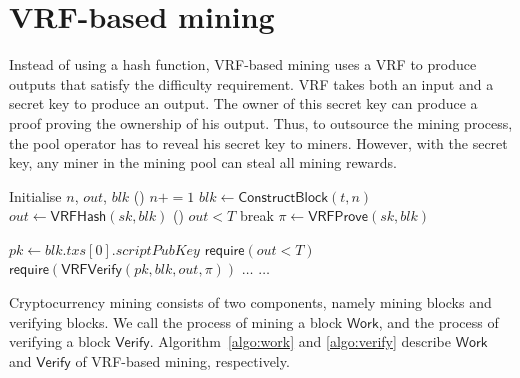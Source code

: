 \section{VRF-based mining}
\label{sec:construction}

Instead of using a hash function, VRF-based mining uses a VRF to produce outputs that satisfy the difficulty requirement.
VRF takes both an input and a secret key to produce an output.
The owner of this secret key can produce a proof proving the ownership of his output.
Thus, to outsource the mining process, the pool operator has to reveal his secret key to miners.
However, with the secret key, any miner in the mining pool can steal all mining rewards.

\begin{algorithm}[]
\caption{$\mathsf{Work}(sk, t, T)$.}\label{algo:work}
\SetAlgoLined\DontPrintSemicolon
{}
  Initialise $n$, $out$, $blk$ 
  \While () {$n += 1$}{
    $blk \gets \mathsf{ConstructBlock}(t, n)$ 
    $out \gets \mathsf{VRFHash}(sk, blk)$ 
    \If () {$out < T$}{
      break 
    }
  }
  $\pi \gets \mathsf{VRFProve}(sk, blk)$ 
   
\end{algorithm}



\begin{algorithm}[h]
\caption{$\mathsf{Verify}(blk, out, \pi, T)$}\label{algo:verify}
\SetAlgoLined\DontPrintSemicolon
$pk \gets blk . txs[0] . scriptPubKey$ 
$\mathsf{require}(out < T)$ 
$\mathsf{require}(\mathsf{VRFVerify}(pk, blk, out, \pi))$ \;
$\dots$ 
$\dots$ 
\end{algorithm}

Cryptocurrency mining consists of two components, namely mining blocks and verifying blocks.
We call the process of mining a block $\mathsf{Work}$, and the process of verifying a block $\mathsf{Verify}$.
Algorithm~\ref{algo:work} and \ref{algo:verify} describe $\mathsf{Work}$ and $\mathsf{Verify}$ of VRF-based mining, respectively.

